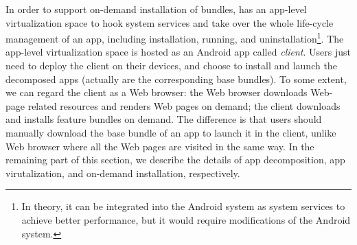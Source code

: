 In order to support on-demand installation of bundles, \nickName{} has an app-level virtualization space to hook system services and take over the whole life-cycle management of an app, including installation, running, and uninstallation\footnote{In theory, it can be integrated into the Android system as system services to achieve better performance, but it would require modifications of the Android system.}. The app-level virtualization space is hosted as an Android app called \emph{\nickName{} client}. Users just need to deploy the \nickName{} client on their devices, and choose to install and launch the decomposed apps (actually are the corresponding base bundles). To some extent, we can regard the \nickName{} client as a Web browser: the Web browser downloads Web-page related resources and renders Web pages on demand; the \nickName{} client downloads and installs feature bundles on demand. The difference is that users should manually download the base bundle of an app to launch it in the \nickName{} client, unlike Web browser where all the Web pages are visited in the same way.
In the remaining part of this section, we describe the details of app decomposition, app virutalization, and on-demand installation, respectively.
